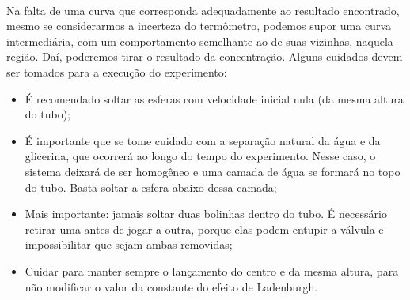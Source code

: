 \documentclass[a4paper, 11pt]{article}
\begin{document}
\begin{enumerate}
	\paragraph{}
Na falta de uma curva que corresponda adequadamente ao resultado encontrado, mesmo se considerarmos a incerteza do termômetro, podemos supor uma curva intermediária, com um comportamento semelhante ao de suas vizinhas, naquela região. Daí, poderemos tirar o resultado da concentração. Alguns cuidados devem ser tomados para a execução do experimento:
	\begin{itemize}
	\item É recomendado soltar as esferas com velocidade inicial nula (da mesma altura do tubo); 
	\item É importante que se tome cuidado com a separação natural da água e da glicerina, que ocorrerá ao longo do tempo do experimento. Nesse caso, o sistema deixará de ser homogêneo e uma camada de água se formará no topo do tubo. Basta soltar a esfera abaixo dessa camada;
	\item Mais importante: jamais soltar duas bolinhas dentro do tubo. É necessário retirar uma antes de jogar a outra, porque elas podem entupir a válvula e impossibilitar que sejam ambas removidas;
	\item Cuidar para manter sempre o lançamento do centro e da mesma altura, para não modificar o valor da constante do efeito de Ladenburgh.
	\end{itemize}

	\end{enumerate}

\end{document}
